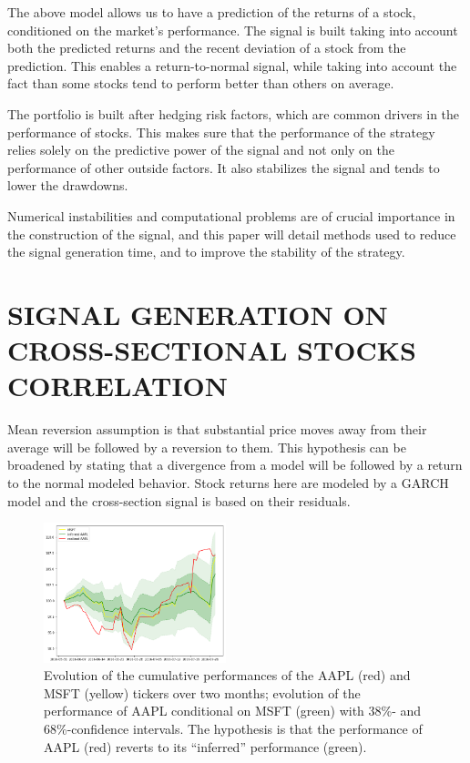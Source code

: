 \documentclass[letterpaper, 10 pt, conference]{ieeeconf}  %
\begin{document}
The above model allows us to have a prediction of the returns of a stock, conditioned on the market's performance. The signal is built taking into account both the predicted returns and the recent deviation of a stock from the prediction. This enables a return-to-normal signal, while taking into account the fact than some stocks tend to perform better than others on average.

The portfolio is built after hedging risk factors, which are common drivers in the performance of stocks. This makes sure that the performance of the strategy relies solely on the predictive power of the signal and not only on the performance of other outside factors. It also stabilizes the signal and tends to lower the drawdowns.

Numerical instabilities and computational problems are of crucial importance in the construction of the signal, and this paper will detail methods used to reduce the signal generation time, and to improve the stability of the strategy.

\section{SIGNAL GENERATION ON CROSS-SECTIONAL STOCKS CORRELATION}
Mean reversion assumption is that substantial price moves away from their average will be followed by a reversion to them. This hypothesis can be broadened by stating that a divergence from a model will be followed by a return to the normal modeled behavior. Stock returns here are modeled by a GARCH model and the cross-section signal is based on their residuals. 

\begin{figure}[t]
\centering
\includegraphics[width=200px]{img/diffusion.png}
\caption{Evolution of the cumulative performances of the AAPL (red) and MSFT (yellow) tickers over two months; evolution of the performance of AAPL conditional on MSFT (green) with 38\%- and 68\%-confidence intervals. The hypothesis is that the performance of AAPL (red) reverts to its ``inferred'' performance (green).}
\label{figurelabel}
\end{figure}
\end{document}
